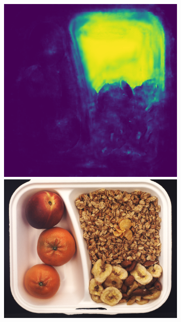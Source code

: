 \begin{figure}[H]
\begin{subfigure}[b]{\textwidth}
\begin{minipage}{0.45\textwidth}
            \includegraphics[width=\textwidth]{figures/appendix/appendix_DRAEM/BB/129_mask.png}
        \end{minipage}
        \begin{minipage}{0.45\textwidth}
            \centering
            \includegraphics[width=\textwidth]{figures/appendix/appendix_DRAEM/BB/226.png}

\end{minipage}
\end{subfigure}
\end{figure}
